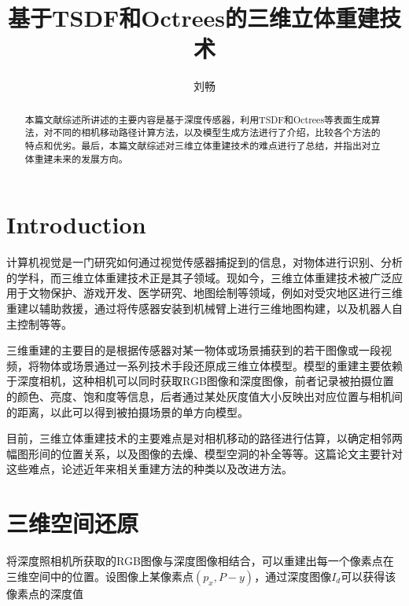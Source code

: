 \documentclass{llncs}
\begin{document}
\begin{CJK}{UTF8}{song}
\title{基于TSDF和Octrees的三维立体重建技术}
\author{刘畅}
\maketitle

\begin{abstract}
本篇文献综述所讲述的主要内容是基于深度传感器，利用TSDF和Octrees等表面生成算法，对不同的相机移动路径计算方法，以及模型生成方法进行了介绍，比较各个方法的特点和优劣。最后，本篇文献综述对三维立体重建技术的难点进行了总结，并指出对立体重建未来的发展方向。
\end{abstract}

\section{Introduction}

计算机视觉是一门研究如何通过视觉传感器捕捉到的信息，对物体进行识别、分析的学科，而三维立体重建技术正是其子领域。现如今，三维立体重建技术被广泛应用于文物保护、游戏开发、医学研究、地图绘制等领域，例如对受灾地区进行三维重建以辅助救援\cite{DBLP:journals/mta/VerykokouIADA18}，通过将传感器安装到机械臂上进行三维地图构建\cite{DBLP:journals/access/BanerjeeYA18}，以及机器人自主控制\cite{DBLP:journals/jfr/LinGQGLWYS18,DBLP:conf/iros/WagnerFB14}等等。

三维重建的主要目的是根据传感器对某一物体或场景捕获到的若干图像或一段视频，将物体或场景通过一系列技术手段还原成三维立体模型。模型的重建主要依赖于深度相机，这种相机可以同时获取RGB图像和深度图像，前者记录被拍摄位置的颜色、亮度、饱和度等信息，后者通过某处灰度值大小反映出对应位置与相机间的距离，以此可以得到被拍摄场景的单方向模型。

目前，三维立体重建技术的主要难点是对相机移动的路径进行估算，以确定相邻两幅图形间的位置关系，以及图像的去燥、模型空洞的补全等等。这篇论文主要针对这些难点，论述近年来相关重建方法的种类以及改进方法。

\section{三维空间还原}

将深度照相机所获取的RGB图像与深度图像相结合，可以重建出每一个像素点在三维空间中的位置。设图像上某像素点$(p_x,P-y)$，通过深度图像$I_d$可以获得该像素点的深度值


\end{CJK}
\end{document}
